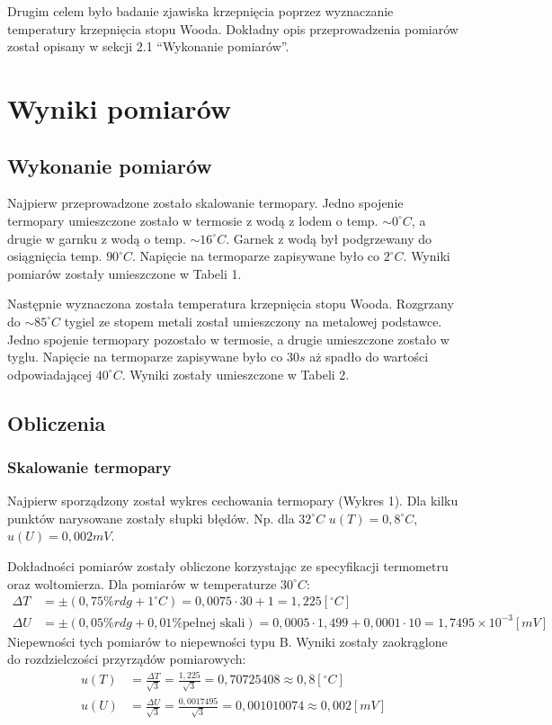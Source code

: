 \documentclass[polish, 11pt, a4paper]{article}
\begin{document}
		Drugim celem było badanie zjawiska krzepnięcia poprzez wyznaczanie temperatury krzepnięcia stopu Wooda.
		Dokładny opis przeprowadzenia pomiarów został opisany w sekcji 2.1 \enquote{Wykonanie pomiarów}.
	\section{Wyniki pomiarów}
		
	\subsection{Wykonanie pomiarów}
		Najpierw przeprowadzone zostało skalowanie termopary. Jedno spojenie termopary umieszczone zostało w termosie z wodą z lodem o temp. \(\sim 0^\circ C\), a drugie w garnku z wodą o temp. \(\sim 16^\circ C\). Garnek z wodą był podgrzewany do osiągnięcia temp. \(90^\circ C\). Napięcie na termoparze zapisywane było co \(2^\circ C\). Wyniki pomiarów zostały umieszczone w Tabeli 1.
		
		Następnie wyznaczona została temperatura krzepnięcia stopu Wooda. Rozgrzany do \(\sim 85^\circ C\) tygiel ze stopem metali został umieszczony na metalowej podstawce. Jedno spojenie termopary pozostało w termosie, a drugie umieszczone zostało w tyglu. Napięcie na termoparze zapisywane było co \(30s\) aż spadło do wartości odpowiadającej \(40^\circ C\). Wyniki zostały umieszczone w Tabeli 2.
	\subsection{Obliczenia}
	
	\subsubsection{Skalowanie termopary}
		Najpierw sporządzony został wykres cechowania termopary (Wykres 1). Dla kilku punktów narysowane zostały słupki błędów. Np. dla \(32^\circ C\) \(u(T)=0,8^\circ C\), \(u(U)=0,002mV\).
		
		Dokładności pomiarów zostały obliczone korzystając ze specyfikacji termometru oraz woltomierza. Dla pomiarów w temperaturze \(30^\circ C\):
		\begin{align*}
		\Delta T&=\pm(0,75\%rdg+1^\circ C) = 0,0075\cdot 30 + 1 = 1,225 [^\circ C]\\
		\Delta U&=\pm(0,05\%rdg+0,01\% \text{pełnej skali}) = 0,0005\cdot 1,499 + 0,0001\cdot 10 = 1,7495\times 10^{-3} [mV]
		\end{align*}
		Niepewności tych pomiarów to niepewności typu B. Wyniki zostały zaokrąglone do rozdzielczości przyrządów pomiarowych:
		\begin{align*}
		u(T)&= \frac{\Delta T}{\sqrt{3}} = \frac{1,225}{\sqrt{3}} = 0,70725408 \approx 0,8 [^\circ C]\\[10pt]
		u(U)&= \frac{\Delta U}{\sqrt{3}} = \frac{0,0017495}{\sqrt{3}} = 0,001010074 \approx 0,002 [mV]
		\end{align*}
		
\end{document}
